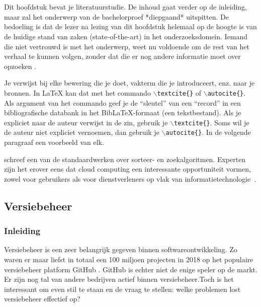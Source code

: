 \chapter{}
\label{ch:stand-van-zaken}



Dit hoofdstuk bevat je literatuurstudie. De inhoud gaat verder op de inleiding, maar zal het onderwerp van de bachelorproef *diepgaand* uitspitten. De bedoeling is dat de lezer na lezing van dit hoofdstuk helemaal op de hoogte is van de huidige stand van zaken (state-of-the-art) in het onderzoeksdomein. Iemand die niet vertrouwd is met het onderwerp, weet nu voldoende om de rest van het verhaal te kunnen volgen, zonder dat die er nog andere informatie moet over opzoeken \autocite{Pollefliet2011}.

Je verwijst bij elke bewering die je doet, vakterm die je introduceert, enz. naar je bronnen. In \LaTeX{} kan dat met het commando \texttt{$\backslash${textcite\{\}}} of \texttt{$\backslash${autocite\{\}}}. Als argument van het commando geef je de ``sleutel'' van een ``record'' in een bibliografische databank in het Bib\LaTeX{}-formaat (een tekstbestand). Als je expliciet naar de auteur verwijst in de zin, gebruik je \texttt{$\backslash${}textcite\{\}}.
Soms wil je de auteur niet expliciet vernoemen, dan gebruik je \texttt{$\backslash${}autocite\{\}}. In de volgende paragraaf een voorbeeld van elk.

\textcite{Knuth1998} schreef een van de standaardwerken over sorteer- en zoekalgoritmen. Experten zijn het erover eens dat cloud computing een interessante opportuniteit vormen, zowel voor gebruikers als voor dienstverleners op vlak van informatietechnologie~\autocite{Creeger2009}.
\newpage
\section{Versiebeheer}
\subsection{Inleiding}
Versiebeheer is een zeer belangrijk gegeven binnen softwareontwikkeling. Zo waren er maar liefst in totaal een 100 miljoen projecten in 2018 op het populaire versiebeheer platform GitHub \autocite{Git2018}. GitHub is echter niet de enige speler op de markt. Er zijn nog tal van andere bedrijven actief binnen versiebeheer.Toch is het interessant om even stil te staan en de vraag te stellen: welke problemen lost versiebeheer effectief op?

